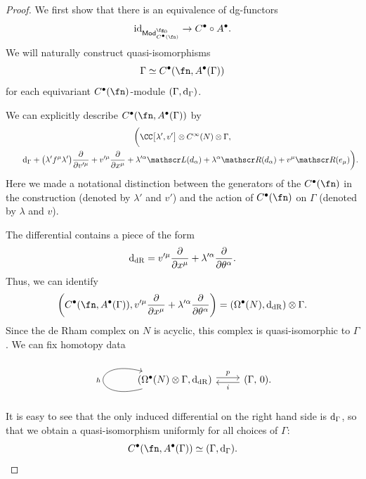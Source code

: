 \documentclass[10pt,a4paper]{amsart}
\numberwithin{equation}{section}
\def\cat#1{\ensuremath{\mathsf{#1}}}
\DeclareMathOperator{\Mod}{\cat{Mod}}
\def\bu{\bullet}
\def\d{{\rm d}}
\def\sL{\mathscr L}
\def\sR{\mathscr R}
\begin{document}
\begin{proof}
	We first show that there is an equivalence of dg-functors
	\begin{equation*}
	\mathrm{id}_{\Mod^{\fg_0}_{C^\bullet({\fn})}} \to C^\bullet \circ A^\bullet .
	\end{equation*}
	We will naturally construct quasi-isomorphisms
	\begin{equation*}
	\Gamma \simeq C^\bu(\fn,A^\bu(\Gamma))
	\end{equation*}
	for each equivariant $C^\bu(\fn)$-module $(\Gamma,\d_\Gamma)$.
	
	We can explicitly describe $C^\bu(\fn,A^\bu(\Gamma))$ by
	\begin{gather*}
	\bigg( \CC\big[\lambda', v'\big] \otimes C^\infty(N) \otimes \Gamma ,\\
\qquad{}  \d_\Gamma + \big(\lambda' f^\mu \lambda'\big) \frac{\partial}{\partial v'^\mu} + v'^\mu \frac{\partial}{\partial x^\mu} + \lambda'^\alpha \sL(d_\alpha) + \lambda^\alpha \sR(d_\alpha) + v^\mu \sR(e_\mu) \bigg) .
	\end{gather*}
	Here we made a notational distinction between the generators of the $C^\bullet(\fn)$ in the construction (denoted by $\lambda'$ and $v'$) and the action of $C^\bullet(\fn)$ on $\Gamma$ (denoted by $\lambda$ and $v$).
	
	The differential contains a piece of the form
	\begin{equation*}
	\d_{\mathrm{dR}} = v'^\mu \frac{\partial}{\partial x^\mu} + \lambda'^\alpha \frac{\partial}{\partial \theta^\alpha} .
	\end{equation*}
	Thus, we can identify
	\begin{equation*}
	\left( C^\bu(\fn,A^\bu(\Gamma)) , v'^\mu \frac{\partial}{\partial x^\mu} + \lambda'^\alpha \frac{\partial}{\partial \theta^\alpha} \right) = \left( \Omega^\bu(N) , \d_{\mathrm{dR}} \right) \otimes \Gamma .
	\end{equation*}
	Since the de Rham complex on $N$ is acyclic, this complex is quasi-isomorphic to $\Gamma$. We can fix homotopy data
	\begin{equation*}
	\begin{tikzcd}
	\arrow[loop left]{l}{h} \left( \Omega^\bu(N) \otimes \Gamma , \d_{\mathrm{dR}} \right) \arrow[r, shift left, "p"] & (\Gamma , \, 0)\arrow[l, shift left, "i"] .
	\end{tikzcd}
	\end{equation*}
	It is easy to see that the only induced differential on the right hand side is $\d_\Gamma$, so that we obtain a quasi-isomorphism uniformly for all choices of $\Gamma$:
	\begin{equation*}
	C^\bu(\fn,A^\bu(\Gamma)) \simeq (\Gamma , \d_\Gamma) .
	\end{equation*}
	

\end{proof}
\end{document}
